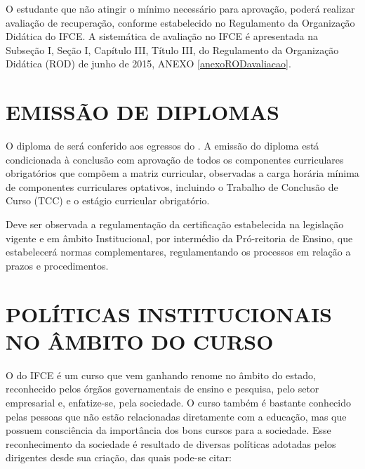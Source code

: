 \documentclass{paper}
\begin{document}
O estudante que não atingir o mínimo necessário para aprovação, poderá realizar avaliação de recuperação, conforme estabelecido no Regulamento da Organização Didática do IFCE. A sistemática de avaliação no IFCE é apresentada na Subseção I, Seção I, Capítulo III, Título III, do Regulamento da Organização Didática (ROD) de junho de 2015, ANEXO \ref{anexoRODavaliacao}.


\clearpage
\section{EMISSÃO DE DIPLOMAS}

O diploma de \NOMEEGRESSO será conferido aos egressos do \NOMECURSO . A emissão do diploma  está condicionada à conclusão com aprovação de todos os componentes curriculares obrigatórios que compõem a matriz curricular, observadas a carga horária mínima de componentes curriculares optativos, incluindo o Trabalho de Conclusão de Curso (TCC) e o estágio curricular obrigatório. 

Deve ser observada a regulamentação da certificação estabelecida na legislação vigente e em âmbito Institucional, por intermédio da Pró-reitoria de Ensino, que estabelecerá normas complementares, regulamentando os processos em relação a prazos e procedimentos.


\clearpage
\section{POLÍTICAS INSTITUCIONAIS NO ÂMBITO DO CURSO}

O \NOMECURSO do IFCE é um curso que vem ganhando renome no âmbito do estado, reconhecido pelos órgãos governamentais de ensino e pesquisa, pelo setor empresarial e, enfatize-se, pela sociedade. O curso também é bastante conhecido pelas pessoas que não estão relacionadas diretamente com a educação, mas que possuem consciência da importância dos bons cursos para a sociedade. Esse reconhecimento da sociedade é resultado de diversas políticas adotadas pelos dirigentes desde sua criação, das quais pode-se citar:
\end{document}
